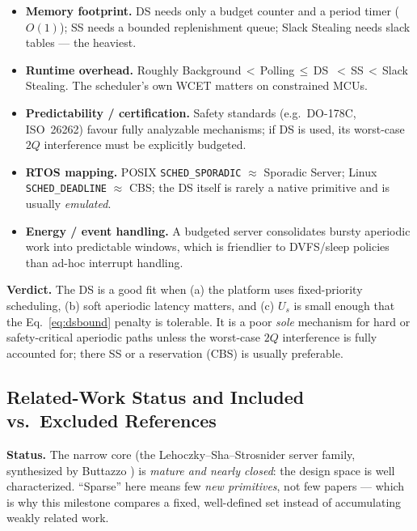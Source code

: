 \documentclass[conference]{IEEEtran}
\begin{document}
\begin{itemize}
  \item \textbf{Memory footprint.} DS needs only a budget counter and a period
        timer ($O(1)$); SS needs a bounded replenishment queue; Slack Stealing
        needs slack tables --- the heaviest.
  \item \textbf{Runtime overhead.} Roughly Background\,$<$\,Polling\,$\le$\,DS
        \,$<$\,SS\,$<$\,Slack Stealing. The scheduler's own WCET matters on
        constrained MCUs.
  \item \textbf{Predictability / certification.} Safety standards
        (e.g.\ DO-178C, ISO~26262) favour fully analyzable mechanisms; if DS is
        used, its worst-case $2Q$ interference must be explicitly budgeted.
  \item \textbf{RTOS mapping.} POSIX \texttt{SCHED\_SPORADIC} $\approx$ Sporadic
        Server; Linux \texttt{SCHED\_DEADLINE} $\approx$ CBS; the DS itself is
        rarely a native primitive and is usually \emph{emulated}.
  \item \textbf{Energy / event handling.} A budgeted server consolidates bursty
        aperiodic work into predictable windows, which is friendlier to
        DVFS/sleep policies than ad-hoc interrupt handling.
\end{itemize}
\noindent\textbf{Verdict.} The DS is a good fit when (a) the platform uses
fixed-priority scheduling, (b) soft aperiodic latency matters, and (c) $U_s$ is
small enough that the Eq.~\eqref{eq:dsbound} penalty is tolerable. It is a poor
\emph{sole} mechanism for hard or safety-critical aperiodic paths unless the
worst-case $2Q$ interference is fully accounted for; there SS or a reservation
(CBS) is usually preferable.

\subsection{Related-Work Status and Included vs.\ Excluded References}

\noindent\textbf{Status.} The narrow core (the Lehoczky--Sha--Strosnider server
family, synthesized by Buttazzo \cite{buttazzo2011hard}) is \emph{mature and
nearly closed}: the design space is well characterized. ``Sparse'' here means
few \emph{new primitives}, not few papers --- which is why this milestone
compares a fixed, well-defined set instead of accumulating weakly related work.
\end{document}
